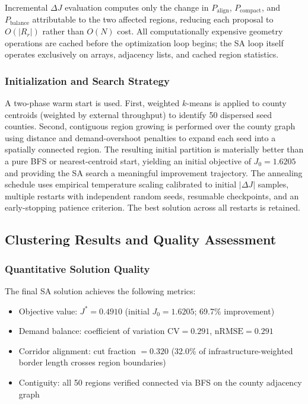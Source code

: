 Incremental $\Delta J$ evaluation computes only the change in $P_{\text{align}}$,
$P_{\text{compact}}$, and $P_{\text{balance}}$ attributable to the two affected regions,
reducing each proposal to $O(|R_r|)$ rather than $O(N)$ cost. All computationally expensive
geometry operations are cached before the optimization loop begins; the SA loop itself
operates exclusively on arrays, adjacency lists, and cached region statistics.

\subsubsection{Initialization and Search Strategy}

A two-phase warm start is used. First, weighted $k$-means is applied to county centroids
(weighted by external throughput) to identify 50 dispersed seed counties. Second, contiguous
region growing is performed over the county graph using distance and demand-overshoot
penalties to expand each seed into a spatially connected region. The resulting initial
partition is materially better than a pure BFS or nearest-centroid start, yielding an
initial objective of $J_0 = 1.6205$ and providing the SA search a meaningful improvement
trajectory. The annealing schedule uses empirical temperature scaling calibrated to initial
$|\Delta J|$ samples, multiple restarts with independent random seeds, resumable
checkpoints, and an early-stopping patience criterion. The best solution across all restarts
is retained.

\subsection{Clustering Results and Quality Assessment}

\subsubsection{Quantitative Solution Quality}

The final SA solution achieves the following metrics:
\begin{itemize}
  \item Objective value: $J^* = 0.4910$ (initial $J_0 = 1.6205$; 69.7\% improvement)
  \item Demand balance: coefficient of variation $\mathrm{CV} = 0.291$,
        $\mathrm{nRMSE} = 0.291$
  \item Corridor alignment: cut fraction $= 0.320$ (32.0\% of infrastructure-weighted
        border length crosses region boundaries)
  \item Contiguity: all 50 regions verified connected via BFS on the county adjacency graph
\end{itemize}

